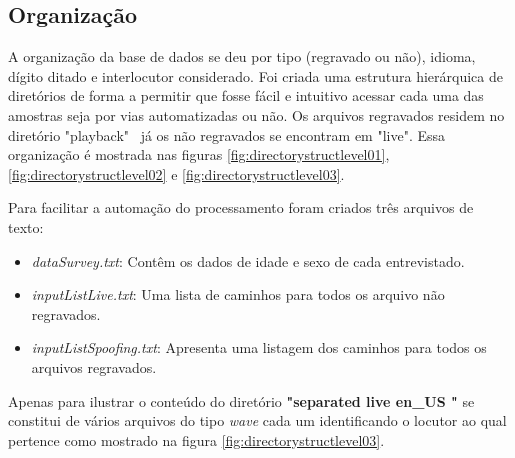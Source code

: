 \begin{myenv}{1.5}
			\subsection{Organização}
				\par A organização da base de dados se deu por tipo (regravado ou não), idioma, dígito ditado e interlocutor considerado. Foi criada uma estrutura hierárquica de diretórios de forma a permitir que fosse fácil e intuitivo acessar cada uma das amostras seja por vias automatizadas ou não. Os arquivos regravados residem no diretório "playback" \ já os não regravados se encontram em "live".	Essa organização é mostrada nas figuras \ref{fig:directorystructlevel01}, \ref{fig:directorystructlevel02} e \ref{fig:directorystructlevel03}.
				
				\par Para facilitar a automação do processamento foram criados três arquivos de texto:
				\begin{itemize}
					\item \textit{dataSurvey.txt}: Contêm os dados de idade e sexo de cada entrevistado.
					\item \textit{inputListLive.txt}: Uma lista de caminhos para todos os arquivo não regravados.
					\item \textit{inputListSpoofing.txt}: Apresenta uma listagem dos caminhos para todos os arquivos regravados.
				\end{itemize}
			
				\par Apenas para ilustrar o conteúdo do diretório \textbf{"separated \textfractionsolidus live \textfractionsolidus en\_US "} se constitui de vários arquivos do tipo \textit{wave} cada um identificando o locutor ao qual pertence como mostrado na  figura \ref{fig:directorystructlevel03}.


\end{myenv}
